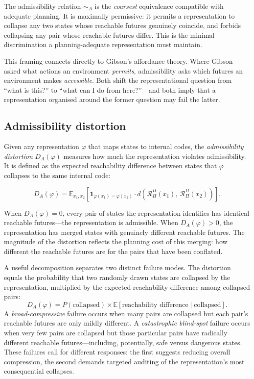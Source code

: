 \documentclass[11pt,a4paper]{article}
\newcommand{\simA}{\sim_{\!A}}
\begin{document}
The admissibility relation $\simA$ is the \emph{coarsest} equivalence compatible
with adequate planning. It is maximally permissive: it permits a representation
to collapse any two states whose reachable futures genuinely coincide, and
forbids collapsing any pair whose reachable futures differ. This is the minimal
discrimination a planning-adequate representation must maintain.

This framing connects directly to Gibson's affordance theory. Where Gibson asked
what actions an environment \emph{permits}, admissibility asks which futures an
environment makes \emph{accessible}. Both shift the representational question
from ``what is this?'' to ``what can I do from here?''---and both imply that
a representation organised around the former question may fail the latter.

\subsection{Admissibility distortion}

Given any representation $\varphi$ that maps states to internal codes, the
\emph{admissibility distortion} $D_A(\varphi)$ measures how much the
representation violates admissibility. It is defined as the expected reachability
difference between states that $\varphi$ collapses to the same internal code:

\[
  D_A(\varphi) = \mathbb{E}_{x_1, x_2}\!\left[
    \mathbf{1}_{\varphi(x_1) = \varphi(x_2)}
    \cdot d\!\left(\mathcal{R}_H^\Pi(x_1),\, \mathcal{R}_H^\Pi(x_2)\right)
  \right].
\]

When $D_A(\varphi) = 0$, every pair of states the representation identifies has
identical reachable futures---the representation is admissible. When
$D_A(\varphi) > 0$, the representation has merged states with genuinely different
reachable futures. The magnitude of the distortion reflects the planning cost
of this merging: how different the reachable futures are for the pairs that have
been conflated.

A useful decomposition separates two distinct failure modes. The distortion equals
the probability that two randomly drawn states are collapsed by the representation,
multiplied by the expected reachability difference among collapsed pairs:
\[
  D_A(\varphi) = P(\text{collapsed}) \times \mathbb{E}[\text{reachability difference} \mid \text{collapsed}].
\]
A \emph{broad-compressive} failure occurs when many pairs are collapsed but each
pair's reachable futures are only mildly different. A \emph{catastrophic blind-spot}
failure occurs when very few pairs are collapsed but those particular pairs have
radically different reachable futures---including, potentially, safe versus
dangerous states. These failures call for different responses: the first suggests
reducing overall compression, the second demands targeted auditing of the
representation's most consequential collapses.
\end{document}
